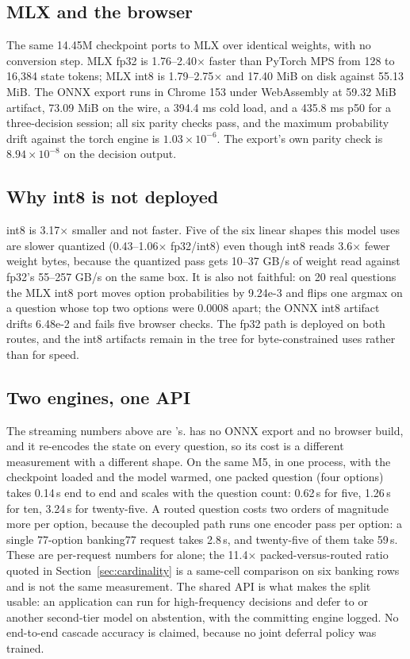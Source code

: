 \subsection{MLX and the browser}
The same 14.45M checkpoint ports to MLX over identical weights, with no conversion step. MLX fp32
is 1.76--2.40$\times$ faster than PyTorch MPS from 128 to 16{,}384 state tokens; MLX int8 is
1.79--2.75$\times$ and 17.40 MiB on disk against 55.13 MiB. The ONNX export runs in Chrome 153
under WebAssembly at 59.32 MiB artifact, 73.09 MiB on the wire, a 394.4 ms cold load, and a 435.8
ms p50 for a three-decision session; all six parity checks pass, and the maximum probability drift
against the torch engine is $1.03\times10^{-6}$. The export's own parity check is
$8.94\times10^{-8}$ on the decision output.

\subsection{Why int8 is not deployed}
int8 is 3.17$\times$ smaller and not faster. Five of the six linear shapes this model uses are
slower quantized (0.43--1.06$\times$ fp32/int8) even though int8 reads 3.6$\times$ fewer weight
bytes, because the quantized pass gets 10--37 GB/s of weight read against fp32's 55--257 GB/s on
the same box. It is also not faithful: on 20 real questions the MLX int8 port moves option
probabilities by 9.24e-3 and flips one argmax on a question whose top two options were 0.0008
apart; the ONNX int8 artifact drifts 6.48e-2 and fails five browser checks. The fp32 path is deployed on
both routes, and the int8 artifacts remain in the tree for byte-constrained uses rather than for
speed.

\subsection{Two engines, one API}
The streaming numbers above are \stream{}'s. \vsix{} has no ONNX export and no browser build, and
it re-encodes the state on every question, so its cost is a different measurement with a different
shape. On the same M5, in one process, with the checkpoint loaded and the model warmed, one packed
question (four options) takes 0.14\,s end to end and scales with the question count: 0.62\,s for
five, 1.26\,s for ten, 3.24\,s for twenty-five. A routed question costs two orders of magnitude
more per option, because the decoupled path runs one encoder pass per option: a single 77-option
banking77 request takes 2.8\,s, and twenty-five of them take 59\,s. These are per-request numbers
for \vsix{} alone; the 11.4$\times$ packed-versus-routed ratio quoted in
Section~\ref{sec:cardinality} is a same-cell comparison on six banking rows and is not the same
measurement.
The shared API is what makes the split usable: an application can run \stream{} for high-frequency
decisions and defer to \vsix{} or another second-tier model on abstention, with the committing
engine logged. No end-to-end cascade accuracy is claimed, because no joint deferral policy was
trained.

